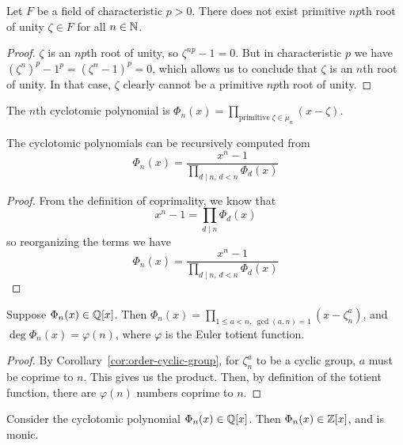 \begin{proposition}\label{prop:no-npth-root-of-unity}
    Let \(F\) be a field of characteristic \(p > 0\).
    There does not exist primitive \(np\)th root of unity \(\zeta \in F\)
    for all \(n \in \mathbb{N}\).
\end{proposition}
\begin{proof}
    \(\zeta\) is an \(np\)th root of unity,
    so \(\zeta^{np} - 1 = 0\).
    But in characteristic \(p\) we have
    \({(\zeta^n)}^p - 1^p = {(\zeta^n - 1)}^p = 0\),
    which allows us to conclude that \(\zeta\) is an \(n\)th root of unity.
    In that case, \(\zeta\) clearly cannot be a primitive \(np\)th root of unity.
\end{proof}

\begin{definition}
    The \(n\)th cyclotomic polynomial is
    \(\Phi_n(x) = \prod_{\text{primitive}\;\zeta\in\mu_n} (x-\zeta)\).
\end{definition}
\begin{lemma}\label{lem:cyclotomic-recursive}
    The cyclotomic polynomials can be recursively computed from
    \[\Phi_n(x) = \frac{x^n - 1}{\prod_{d \mid n,\, d < n} \Phi_d(x)}\]
\end{lemma}
\begin{proof}
    From the definition of coprimality, we know that
    \[x^n - 1 = \prod_{d \mid n} \Phi_d(x)\]
    so reorganizing the terms we have
    \[\Phi_n(x) = \frac{x^n - 1}{\prod_{d \mid n,\, d < n} \Phi_d(x)}\]
\end{proof}
\begin{proposition}
    Suppose \(\Phi_n(x) \in \mathbb{Q}[x]\).
    Then \(\Phi_n(x)  = \prod_{1 \leq a < n,\; \gcd(a,n) = 1} (x-\zeta_n^a)\),
    and \(\deg \Phi_n(x) = \varphi(n)\),
    where \(\varphi\) is the Euler totient function.
\end{proposition}
\begin{proof}
    By Corollary~\ref{cor:order-cyclic-group},
    for \(\zeta_n^a\) to be a cyclic group, \(a\) must be coprime to \(n\).
    This gives us the product.
    Then, by definition of the totient function, there are \(\varphi(n)\) numbers coprime to \(n\).
\end{proof}
\begin{proposition}
    Consider the cyclotomic polynomial \(\Phi_n(x) \in \mathbb{Q}[x]\).
    Then \(\Phi_n(x) \in \mathbb{Z}[x]\), and is monic.
\end{proposition}
